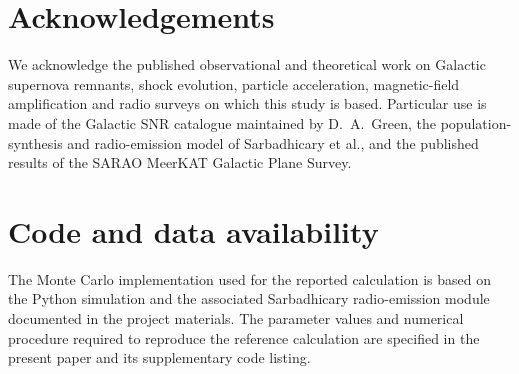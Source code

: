 \documentclass[
aps,
prd,
reprint,
superscriptaddress,
nofootinbib
]{revtex4-2}
\begin{document}
	\section*{Acknowledgements}
	
	We acknowledge the published observational and theoretical work on
	Galactic supernova remnants, shock evolution, particle acceleration,
	magnetic-field amplification and radio surveys on which this study is based.
	Particular use is made of the Galactic SNR catalogue maintained by D.~A.~Green,
	the population-synthesis and radio-emission model of Sarbadhicary et al., and
	the published results of the SARAO MeerKAT Galactic Plane Survey.
	
	\section*{Code and data availability}
	
	The Monte Carlo implementation used for the reported calculation is based on
	the Python simulation and the associated Sarbadhicary radio-emission module
	documented in the project materials.  The parameter values and numerical
	procedure required to reproduce the reference calculation are specified in
	the present paper and its supplementary code listing.
	



	
\end{document}
